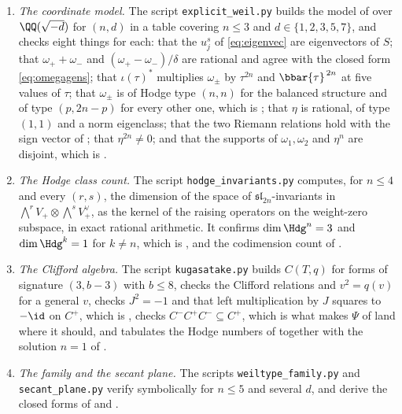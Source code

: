 \begin{enumerate}[label=\textup{(\Roman*)},leftmargin=*]
\item \emph{The coordinate model.} The script \texttt{explicit\_weil.py}
  builds the model of  over $\QQ(\sqrt{-d})$ for
  $(n,d)$ in a table covering $n\le3$ and $d\in\{1,2,3,5,7\}$, and checks
  eight things for each: that the $u^{s}_{j}$ of \eqref{eq:eigenvec} are
  eigenvectors of $S$; that $\omega_{+}+\omega_{-}$ and
  $(\omega_{+}-\omega_{-})/\delta$ are rational and agree with the closed form
  \eqref{eq:omegagens}; that $\iota(\tau)^{*}$ multiplies $\omega_{\pm}$ by
  $\tau^{2n}$ and $\bbar{\tau}^{\,2n}$ at five values of $\tau$; that
  $\omega_{\pm}$ is of Hodge type $(n,n)$ for the balanced structure and of
  type $(p,2n-p)$ for every other one, which is ;
  that $\eta$ is rational, of type $(1,1)$ and a norm eigenclass; that the two
  Riemann relations hold with the sign vector of ; that
  $\eta^{2n}\ne0$; and that the supports of $\omega_{1},\omega_{2}$ and
  $\eta^{n}$ are disjoint, which is .

\item \emph{The Hodge class count.} The script \texttt{hodge\_invariants.py}
  computes, for $n\le4$ and every $(r,s)$, the dimension of the space of
  $\mathfrak{sl}_{2n}$-invariants in
  $\bigwedge^{r}V_{+}\otimes\bigwedge^{s}V_{+}^{\vee}$, as the kernel of the
  raising operators on the weight-zero subspace, in exact rational arithmetic.
  It confirms $\dim\Hdg^{n}=3$ and $\dim\Hdg^{k}=1$ for $k\ne n$, which is
  , and the codimension count of .

\item \emph{The Clifford algebra.} The script \texttt{kugasatake.py} builds
  $C(T,q)$ for forms of signature $(3,b-3)$ with $b\le8$, checks the Clifford
  relations and $v^{2}=q(v)$ for a general $v$, checks $J^{2}=-1$ and that
  left multiplication by $J$ squares to $-\id$ on $C^{+}$, which is
  , checks $C^{-}C^{+}C^{-}\subseteq C^{+}$, which is what
  makes $\Psi$ of  land where it should, and tabulates the
  Hodge numbers of  together with the solution $n=1$ of
  .

\item \emph{The family and the secant plane.} The scripts
  \texttt{weiltype\_family.py} and \texttt{secant\_plane.py} verify
   symbolically for $n\le5$ and several $d$, and
  derive the closed forms of  and
  .


\end{enumerate}
